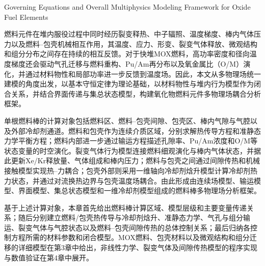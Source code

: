 

{Governing Equations and Overall Multiphysics Modeling Framework for Oxide Fuel Elements}
\label{chap:multiphysics_governing_framework}

\label{sec:ch2_introduction}

燃料元件在堆内服役过程中同时经历裂变释热、中子辐照、温度梯度、棒内气体压力以及燃料--包壳机械相互作用，其温度、应力、形变、裂变气体释放、微观结构和组分分布之间存在持续的相互反馈\cite{vanuffelenReviewFuelPerformance2019}。对于快堆MOX燃料，高功率密度和径向温度梯度还会驱动气孔迁移与燃料重构、Pu/Am再分布以及氧金属比（O/M）演化，并通过材料物性和局部功率进一步反馈到温度场。因此，本文从多物理场统一建模的角度出发，以基本守恒定律为理论基础，以材料物性与堆内行为模型作为闭合关系，并结合界面传递与集总状态模型，构建氧化物燃料元件多物理场耦合分析框架。

单根燃料棒的计算对象包括燃料区、燃料--包壳间隙、包壳区、棒内气隙与气腔以及外部冷却剂通道。燃料和包壳作为连续介质区域，分别求解热传导方程和准静态力学平衡方程；燃料内部进一步通过输运方程描述孔隙率、Pu/Am浓度和O/M等状态变量的时空演化。裂变气体行为模型连接燃料细观演化与棒内气体状态，并据此更新Xe/Kr释放量、气体组成和棒内压力；燃料与包壳之间通过间隙传热和机械接触模型实现热--力耦合；包壳外部则采用一维轴向冷却剂{\rarecharfont 焓}升模型计算冷却剂热力状态，并通过对流换热边界与包壳温度场耦合。由此形成由连续场模型、输运模型、界面模型、集总状态模型和一维冷却剂模型组成的燃料棒多物理场分析框架。

基于上述计算对象，本章首先给出燃料棒计算区域、模型层级和主要变量传递关系；随后分别建立燃料/包壳热传导与冷却剂{\rarecharfont 焓}升、准静态力学、气孔与组分输运、裂变气体与气腔状态以及燃料--包壳间隙传热的总体控制关系；最后归纳各控制方程所需的材料参数和闭合模型。MOX燃料、包壳材料以及微观结构和组分迁移的详细模型在第3章中给出，非线性力学、裂变气体及间隙传热模型的程序实现与数值验证在第4章中展开。

\label{sec:ch2_fuel_rod_object}

\label{subsec:ch2_domains}

